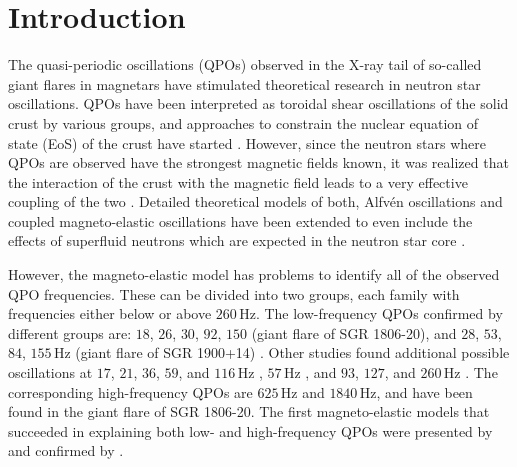 \documentclass[useAMS,usenatbib]{mnras}
\begin{document}
\section{Introduction}
The quasi-periodic oscillations (QPOs) observed in the X-ray tail of  so-called giant flares in magnetars \citep[e.g.][]{Israel2005, Strohmayer2005, Watts2006,Strohmayer2006} have stimulated theoretical research in neutron star oscillations. 
QPOs have been interpreted  as toroidal shear oscillations of the solid crust by various groups, and approaches to constrain the nuclear equation of state (EoS) of the crust have started \citep[see][and references therein]{Duncan1998, 
Messios2001, Strohmayer2005, Piro2005, Sotani2007, Samuelsson2007, Steiner2009, Samuelsson2009, Sotani2013, Deibel2014, Sotani2016}. However, since the neutron stars where QPOs are observed have the strongest 
magnetic fields known, it was realized that the interaction of the crust with the magnetic field leads to a very effective coupling of the two \citep{Levin2006,Levin2007,Glampedakis2006b}. Detailed theoretical models of both, 
Alfv\'en oscillations \citep{Cerda2009, Sotani2008, Colaiuda2009} and coupled magneto-elastic oscillations\citep{Gabler2011letter, Gabler2012, Colaiuda2011, vanHoven2011, vanHoven2012} have been extended to even include the effects of superfluid neutrons which are expected in the neutron star core \citep{vanHoven2011, vanHoven2012, Glampedakis2011a, Passamonti2013, Gabler2013b, Passamonti2014, Gabler2016}.

However, the magneto-elastic model has problems to identify all of the observed QPO frequencies. These can be divided into two groups, each family with frequencies either below or above $260\,$Hz. The low-frequency QPOs confirmed by different 
groups are: $18$, $26$, $30$, $92$, $150$ (giant flare of SGR 1806-20), and $28$, $53$, $84$, $155$\,Hz (giant flare of SGR 1900+14) \citep[see e.g.][]{Israel2005, Strohmayer2005, Watts2006,Strohmayer2006}. Other studies found 
additional possible oscillations at $17$, $21$, $36$, $59$, and $116\,$Hz \citep[giant flare of SGR 1806-20,][]{Hambaryan2011}, $57\,$Hz  \citep[less energetic bursts of SGR 1806-20,][]{Huppenkothen2014b},
and $93$, $127$, and $260\,$Hz \citep[less energetic bursts of SGR J1550-5418,][]{Huppenkothen2014a}. The corresponding high-frequency QPOs are $625\,$Hz and  $1840\,$Hz, and have been found in the giant flare of SGR 1806-20. The first magneto-elastic models that succeeded in explaining both low- and high-frequency QPOs were presented by \cite{Gabler2013b} and confirmed by \cite{Passamonti2014}.
\end{document}
